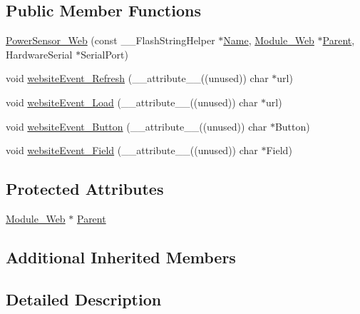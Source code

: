 \subsection*{Public Member Functions}
\begin{DoxyCompactItemize}
\item 
\hyperlink{class_power_sensor___web_a7557ab09526b936ca15b5dc4ecb6f1ef}{Power\+Sensor\+\_\+\+Web} (const \+\_\+\+\_\+\+Flash\+String\+Helper $\ast$\hyperlink{class_common_aeea91a726dbe988e515057b32ba0726f}{Name}, \hyperlink{class_module___web}{Module\+\_\+\+Web} $\ast$\hyperlink{class_power_sensor___web_afa86ee052a15b350d2fba45a45e0d02e}{Parent}, Hardware\+Serial $\ast$Serial\+Port)
\item 
void \hyperlink{class_power_sensor___web_a430e9c91f3fa760d7930cee367b92125}{website\+Event\+\_\+\+Refresh} (\+\_\+\+\_\+attribute\+\_\+\+\_\+((unused)) char $\ast$url)
\item 
void \hyperlink{class_power_sensor___web_aae5b6cccf5a6eb3877e82e518fd69afa}{website\+Event\+\_\+\+Load} (\+\_\+\+\_\+attribute\+\_\+\+\_\+((unused)) char $\ast$url)
\item 
void \hyperlink{class_power_sensor___web_a30ec071067c612277dd426f96cc2f1a3}{website\+Event\+\_\+\+Button} (\+\_\+\+\_\+attribute\+\_\+\+\_\+((unused)) char $\ast$Button)
\item 
void \hyperlink{class_power_sensor___web_ab36fd816b46c6b030a0f4f2f48316c1e}{website\+Event\+\_\+\+Field} (\+\_\+\+\_\+attribute\+\_\+\+\_\+((unused)) char $\ast$Field)
\end{DoxyCompactItemize}
\subsection*{Protected Attributes}
\begin{DoxyCompactItemize}
\item 
\hyperlink{class_module___web}{Module\+\_\+\+Web} $\ast$ \hyperlink{class_power_sensor___web_afa86ee052a15b350d2fba45a45e0d02e}{Parent}
\end{DoxyCompactItemize}
\subsection*{Additional Inherited Members}


\subsection{Detailed Description}


